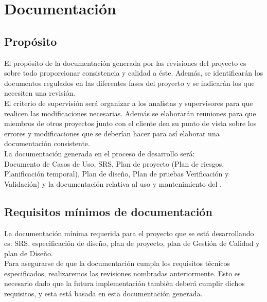 \documentclass[11pt, a4paper, twoside, titlepage]{article}
\begin{document}
	\section{Documentación} %
		\subsection{Propósito}
			El propósito de la documentación generada por las revisiones del proyecto es sobre todo proporcionar consistencia y calidad a éste. Además, se identificarán los documentos regulados en las diferentes fases del proyecto y se indicarán los que necesiten una revisión. \\
			
			El criterio de supervisión será organizar a los analistas y supervisores para que realicen las modificaciones necesarias. Además se elaborarán reuniones para que miembros de otros proyectos junto con el cliente den su punto de vista sobre los errores y modificaciones que se deberían hacer para así elaborar una documentación consistente.\\

			La documentación generada en el proceso de desarrollo será: \\
			Documento de Casos de Uso, SRS, Plan de proyecto (Plan de riesgos, Planificación temporal), Plan de diseño, Plan de pruebas Verificación y Validación) y la documentación relativa al uso y mantenimiento del \software.
			
		\subsection{Requisitos mínimos de documentación}
			La documentación mínima requerida para el proyecto que se está desarrollando es: SRS, especificación de diseño, plan de proyecto, plan de Gestión de Calidad y plan de Diseño.\\
			
			Para asegurarse de que la documentación cumpla los requisitos técnicos especificados, realizaremos las revisiones nombradas
anteriormente. Esto es necesario dado que la futura implementación también deberá cumplir dichos requisitos, y esta está basada en esta documentación generada.\\
\end{document}

